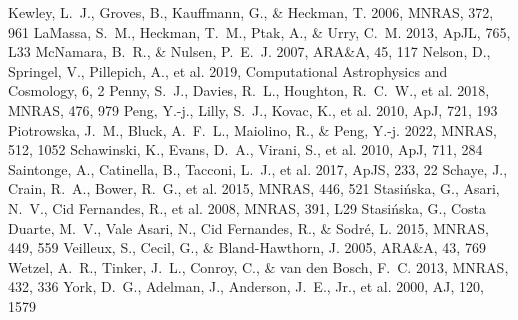 \documentclass[twocolumn]{aastex631}
\begin{document}
\begin{thebibliography}{}
 Kewley, L.~J., Groves, B., Kauffmann, G., \& Heckman, T. 2006, MNRAS, 372, 961
 LaMassa, S.~M., Heckman, T.~M., Ptak, A., \& Urry, C.~M. 2013, ApJL, 765, L33
 McNamara, B.~R., \& Nulsen, P.~E.~J. 2007, ARA\&A, 45, 117
 Nelson, D., Springel, V., Pillepich, A., et al. 2019, Computational Astrophysics and Cosmology, 6, 2
 Penny, S.~J., Davies, R.~L., Houghton, R.~C.~W., et al. 2018, MNRAS, 476, 979
 Peng, Y.-j., Lilly, S.~J., Kovac, K., et al. 2010, ApJ, 721, 193
 Piotrowska, J.~M., Bluck, A.~F.~L., Maiolino, R., \& Peng, Y.-j. 2022, MNRAS, 512, 1052
 Schawinski, K., Evans, D.~A., Virani, S., et al. 2010, ApJ, 711, 284
 Saintonge, A., Catinella, B., Tacconi, L.~J., et al. 2017, ApJS, 233, 22
 Schaye, J., Crain, R.~A., Bower, R.~G., et al. 2015, MNRAS, 446, 521
 Stasi{\'n}ska, G., Asari, N.~V., Cid Fernandes, R., et al. 2008, MNRAS, 391, L29
 Stasi{\'n}ska, G., Costa Duarte, M.~V., Vale Asari, N., Cid Fernandes, R., \& Sodr{\'e}, L. 2015, MNRAS, 449, 559
 Veilleux, S., Cecil, G., \& Bland-Hawthorn, J. 2005, ARA\&A, 43, 769
 Wetzel, A.~R., Tinker, J.~L., Conroy, C., \& van den Bosch, F.~C. 2013, MNRAS, 432, 336
 York, D.~G., Adelman, J., Anderson, J.~E., Jr., et al. 2000, AJ, 120, 1579
\end{thebibliography}
\end{document}
